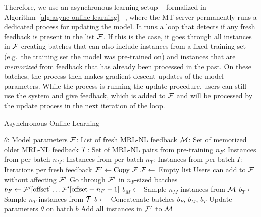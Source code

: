 Therefore, we use an asynchronous learning setup – formalized in
Algorithm~\ref{alg:async-online-learning} –, where the MT server permanently
runs a dedicated process for updating the model. It runs a loop that detects if
any fresh feedback is present in the list \(\cal{F}\). If this is the case, it
goes through all instances in \(\cal{F}\) creating batches that can also include
instances from a fixed training set (e.g.\ the training set the model was
pre-trained on) and instances that are \emph{memorized} from feedback that has
already been processed in the past. On these batches, the process then makes
gradient descent updates of the model parameters. While the process is running
the update procedure, users can still use the system and give feedback, which is
added to \(\cal{F}\) and will be processed by the update process in the next
iteration of the loop.

\begin{algorithm}
  \caption{Asynchronous Online Learning}
  \label{alg:async-online-learning}
  \begin{algorithmic}[1]
      \State $\theta$: Model parameters
      \State $\cal{F}$: List of fresh MRL-NL feedback
      \State $\cal{M}$: Set of memorized older MRL-NL feedback
      \State $\cal{T}$: Set of MRL-NL pairs from pre-training
      \State $n_F$: Instances from  per batch
      \State $n_M$: Instances from  per batch
      \State $n_T$: Instances from  per batch
      \State $I$: Iterations per fresh feedback
      \Loop
          \State $\cal{F}' \gets \text{Copy } \cal{F}$
          \State $\cal{F} \gets$ Empty list
          \Comment Users can add to $\cal{F}$ without affecting $\cal{F}'$
            \State \Comment Go through $\cal{F}'$ in $n_F$-sized batches
            \State $b_F \gets {\cal{F}'}[\text{offset}] \ldots {\cal{F}'}[\text{offset} + n_F - 1]$
            \State $b_M \gets$ Sample $n_M$ instances from $\cal{M}$
            \State $b_T \gets$ Sample $n_T$ instances from $\cal{T}$
            \State $b \gets$ Concatenate batches $b_F$, $b_M$, $b_T$
            \State Update parameters $\theta$ on batch $b$
            \EndFor
          \EndFor
          \State Add all instances in $\cal{F}'$ to $\cal{M}$
        \EndIf
      \EndLoop
    \EndProcedure
  \end{algorithmic}
\end{algorithm}

